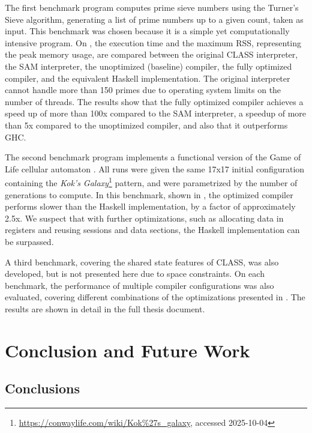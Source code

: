 \documentclass[sigconf,nonacm,natbib=true]{acmart}
\begin{document}
The first benchmark program computes prime sieve numbers using the Turner's Sieve algorithm, generating a list of prime numbers up to a given count, taken as input. This benchmark was chosen because it is a simple yet computationally intensive program. On , the execution time and the maximum \ac{RSS}, representing the peak memory usage, are compared between the original \ac{CLASS} interpreter, the \ac{SAM} interpreter, the unoptimized (baseline) compiler, the fully optimized compiler, and the equivalent Haskell implementation. The original interpreter cannot handle more than 150 primes due to operating system limits on the number of threads. The results show that the fully optimized compiler achieves a speed up of more than 100x compared to the \ac{SAM} interpreter, a speedup of more than 5x compared to the unoptimized compiler, and also that it outperforms GHC.

The second benchmark program implements a functional version of the Game of Life cellular automaton \citep{GameOfLife:1970}. All runs were given the same 17x17 initial configuration containing the \textit{Kok's Galaxy}\footnote{\url{https://conwaylife.com/wiki/Kok\%27s_galaxy}, accessed 2025-10-04} pattern, and were parametrized by the number of generations to compute. In this benchmark, shown in , the optimized compiler performs slower than the Haskell implementation, by a factor of approximately 2.5x. We suspect that with further optimizations, such as allocating data in registers and reusing sessions and data sections, the Haskell implementation can be surpassed.

A third benchmark, covering the shared state features of \ac{CLASS}, was also developed, but is not presented here due to space constraints. On each benchmark, the performance of multiple compiler configurations was also evaluated, covering different combinations of the optimizations presented in . The results are shown in detail in the full thesis document.

\section{Conclusion and Future Work}

\subsection{Conclusions}
\end{document}
